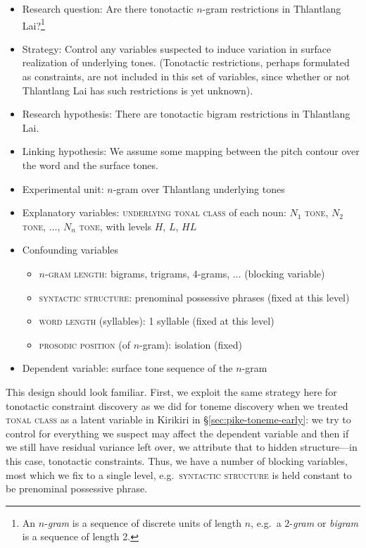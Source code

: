 \documentclass[12pt]{article}
\begin{document}
\begin{itemize}
  \item Research question: Are there tonotactic $n$-gram restrictions in
  Thlantlang Lai?\footnote{An $n$-\textit{gram} is a sequence of
    discrete units of length $n$, e.g.\ a $2$-\textit{gram} or \textit{bigram}
    is a sequence of length 2.}
  \item Strategy: Control any variables suspected to induce variation in
  surface realization of underlying tones. (Tonotactic restrictions,
  perhaps formulated as constraints,
  are not included in this set of variables, since whether or not
  Thlantlang Lai has such restrictions is yet unknown).
  \item Research hypothesis: There are tonotactic bigram restrictions in
  Thlantlang Lai.
  \item Linking hypothesis: We assume some mapping between the pitch
  contour over the word and the surface tones.
  \item Experimental unit: $n$-gram over Thlantlang underlying
  tones 
  \item Explanatory variables: \textsc{underlying tonal class} of each noun: $N_1$
  \textsc{tone}, $N_2$ \textsc{tone}, $\ldots$, $N_n$ \textsc{tone},
  with levels $H$, $L$, $HL$
  \item Confounding variables
  \begin{itemize}
    \item $n$-\textsc{gram length}: bigrams, trigrams, 4-grams, $\ldots$
    (blocking variable)
    \item \textsc{syntactic structure}: prenominal possessive phrases (fixed at
    this level)  
    \item \textsc{word length} (syllables): 1 syllable (fixed at this
    level)
    \item \textsc{prosodic position} (of $n$-gram): isolation (fixed)
  \end{itemize}
  \item Dependent variable: surface tone sequence of the $n$-gram
\end{itemize}


This design should look familiar. First, we exploit the same strategy
here for tonotactic constraint discovery as we did for toneme
discovery when we treated \textsc{tonal class} as a latent variable in
Kirikiri in \S\ref{sec:pike-toneme-early}: we try to control for
everything we suspect may affect the dependent variable and then if we
still have residual variance left over, we attribute that to hidden
structure---in this case, tonotactic constraints. Thus, we have a
number of blocking variables, most which we fix to a single level,
e.g.\ \textsc{syntactic structure} is held constant to be prenominal
possessive phrase. 
 
\end{document}
